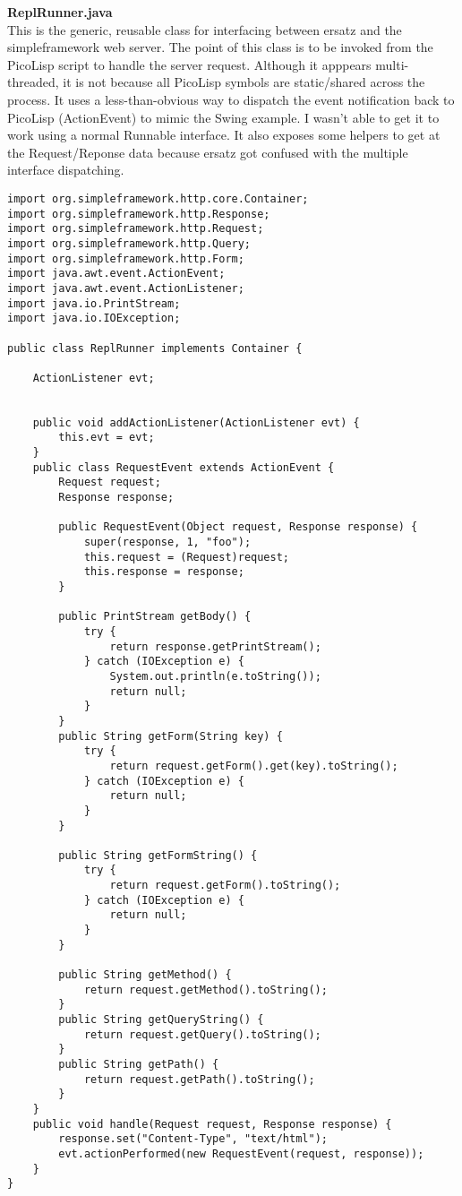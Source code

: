 \documentclass[10pt,a4paper]{article}
\begin{document}
\textbf{ReplRunner.java}
\\
This is the generic, reusable class for interfacing between ersatz and the simpleframework web server.
The point of this class is to be invoked from the PicoLisp script to handle
the server request. Although it apppears multi-threaded, it is not because
all PicoLisp symbols are static/shared across the process. It uses a less-than-obvious way to dispatch the event notification back to PicoLisp (ActionEvent) to mimic the Swing example. I wasn't able to
get it to work using a normal Runnable interface.  It also exposes some helpers to get at the Request/Reponse data because ersatz got confused with the multiple interface dispatching.
\begin{verbatim}
import org.simpleframework.http.core.Container;
import org.simpleframework.http.Response;
import org.simpleframework.http.Request;
import org.simpleframework.http.Query;
import org.simpleframework.http.Form;
import java.awt.event.ActionEvent;
import java.awt.event.ActionListener;
import java.io.PrintStream;
import java.io.IOException;

public class ReplRunner implements Container {

	ActionListener evt;


	public void addActionListener(ActionListener evt) {
		this.evt = evt;
	}
	public class RequestEvent extends ActionEvent {
		Request request;
		Response response;

		public RequestEvent(Object request, Response response) {
			super(response, 1, "foo");
			this.request = (Request)request;
			this.response = response;
		}

		public PrintStream getBody() {
			try {
				return response.getPrintStream();
			} catch (IOException e) {
				System.out.println(e.toString());
				return null;
			}
		}
		public String getForm(String key) {
			try {
				return request.getForm().get(key).toString();
			} catch (IOException e) {
				return null;
			}
		}

		public String getFormString() {
			try {
				return request.getForm().toString();
			} catch (IOException e) {
				return null;
			}
		}

		public String getMethod() {
			return request.getMethod().toString();
		}
		public String getQueryString() {
			return request.getQuery().toString();
		}
		public String getPath() {
			return request.getPath().toString();
		}
	}
	public void handle(Request request, Response response) {
		response.set("Content-Type", "text/html");
		evt.actionPerformed(new RequestEvent(request, response));
	}
}
\end{verbatim}
\end{document}
